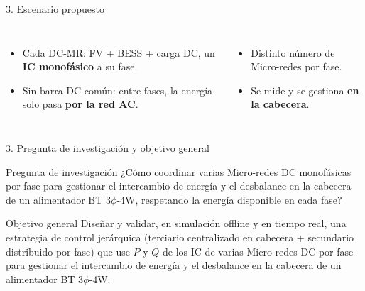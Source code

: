 \documentclass[aspectratio=169,10pt,t]{beamer}
\begin{document}
\begin{frame}{3. Escenario propuesto}
  \vspace{6pt}
  \footnotesize\raggedright
  \begin{columns}[T,onlytextwidth]
    \begin{itemize}\setlength\itemsep{1pt}
      \item Cada DC-MR: FV + BESS + carga DC, un \textbf{IC monofásico} a su fase.
      \item Sin barra DC común: entre fases, la energía solo pasa \textbf{por la red AC}.
    \end{itemize}
    \begin{itemize}\setlength\itemsep{1pt}
      \item Distinto número de Micro-redes por fase.
      \item Se mide y se gestiona \textbf{en la cabecera}.
    \end{itemize}
  \end{columns}
\end{frame}

\begin{frame}{3. Pregunta de investigación y objetivo general}
  \vspace{0.3cm}
  \begin{block}{Pregunta de investigación}
    \footnotesize ¿Cómo coordinar varias Micro-redes DC monofásicas por fase para gestionar el intercambio de energía y el desbalance en la cabecera de un alimentador BT 3$\phi$-4W, respetando la energía disponible en cada fase?
  \end{block}
  \vspace{0.4cm}
  \begin{block}{Objetivo general}
    \footnotesize Diseñar y validar, en simulación offline y en tiempo real, una estrategia de control jerárquica (terciario centralizado en cabecera + secundario distribuido por fase) que use $P$ y $Q$ de los IC de varias Micro-redes DC por fase para gestionar el intercambio de energía y el desbalance en la cabecera de un alimentador BT 3$\phi$-4W.
  \end{block}
\end{frame}
\end{document}
